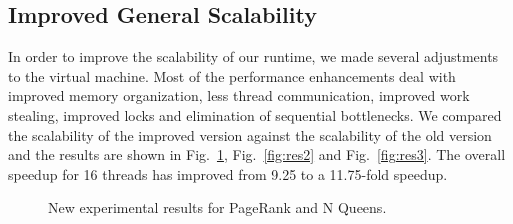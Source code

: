 \documentclass[10pt]{article}
\begin{document}
\subsection{Improved General Scalability}

In order to improve the scalability of our runtime, we made several adjustments
to the virtual machine. Most of the performance enhancements deal with improved
memory organization, less thread communication, improved work stealing, improved
locks and elimination of sequential bottlenecks. We compared the scalability of the
improved version against the scalability of the old version and the results are
shown in Fig.~\ref{fig:res1}, Fig.~\ref{fig:res2} and Fig.~\ref{fig:res3}. The
overall speedup for 16 threads has improved from 9.25 to a 11.75-fold speedup.

\begin{figure}[h]
\begin{center}
\end{center}
\caption{New experimental results for PageRank and N Queens.}
\label{fig:res1}
\end{figure}
\end{document}
